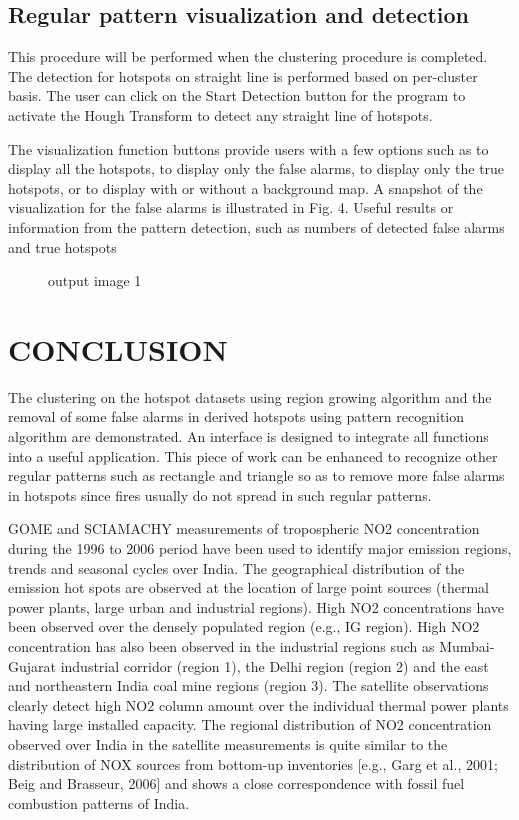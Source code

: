 \documentclass[12pt]{report}	%
\newcommand{\squeezeup}{\vspace{-0.6cm}}
\begin{document}
\section{Regular pattern visualization and detection}
This procedure will be performed when the clustering
procedure is completed. The detection for hotspots on
straight line is performed based on per-cluster basis. The
user can click on the Start Detection button for the program to activate the Hough Transform to detect any straight line of hotspots.

The visualization function buttons provide users with a
few options such as to display all the hotspots, 
to display only the false alarms, to display
only the true hotspots, or to display with or without a
background map. A snapshot of the visualization for the
false alarms is illustrated in Fig. 4. Useful results or
information from the pattern detection, such as numbers
of detected false alarms and true hotspots

\begin{figure}[!h]
	\captionsetup{font=scriptsize}
	\begin{center}
		\centerline{}
		\caption{output image 1}
		\label{fig:8}
	\end{center}
	\squeezeup
\end{figure}


\chapter{CONCLUSION}
The clustering on the hotspot datasets using region
growing algorithm and the removal of some false alarms
in derived hotspots using pattern recognition algorithm are
demonstrated. An interface is designed to integrate all
functions into a useful application. This piece of work can
be enhanced to recognize other regular patterns such as
rectangle and triangle so as to remove more false alarms
in hotspots since fires usually do not spread in such
regular patterns.

GOME and SCIAMACHY measurements of tropospheric
NO2 concentration during the 1996 to 2006 period
have been used to identify major emission regions, trends
and seasonal cycles over India. The geographical distribution
of the emission hot spots are observed at the location of
large point sources (thermal power plants, large urban and
industrial regions). High NO2 concentrations have been
observed over the densely populated region (e.g., IG region).
High NO2 concentration has also been observed in the
industrial regions such as Mumbai-Gujarat industrial corridor
(region 1), the Delhi region (region 2) and the east and
northeastern India coal mine regions (region 3). The satellite
observations clearly detect high NO2 column amount over
the individual thermal power plants having large installed
capacity. The regional distribution of NO2 concentration
observed over India in the satellite measurements is quite
similar to the distribution of NOX sources from bottom-up
inventories [e.g., Garg et al., 2001; Beig and Brasseur,
2006] and shows a close correspondence with fossil fuel
combustion patterns of India.
\end{document}
